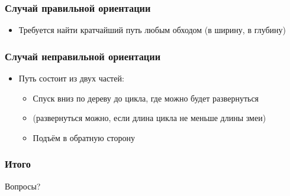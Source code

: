 \begin{frame}
  \frametitle{Случай правильной ориентации}
  \begin{itemize}
    \item Требуется найти кратчайший путь любым обходом (в ширину, в глубину)
  \end{itemize}
\end{frame}

\begin{frame}
  \frametitle{Случай неправильной ориентации}
  \begin{itemize}
    \item Путь состоит из двух частей:
      \begin{itemize}
        \item Спуск вниз по дереву до цикла, где можно будет развернуться
        \item (развернуться можно, если длина цикла не меньше длины змеи)
        \item Подъём в обратную сторону
      \end{itemize}
  \end{itemize}
\end{frame}

\begin{frame}
  \frametitle{Итого}
  Вопросы?
\end{frame}
